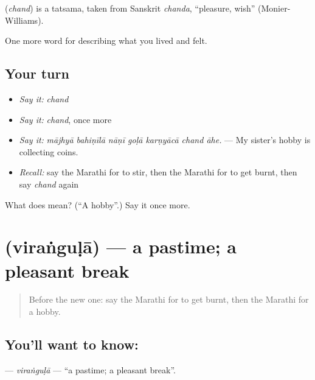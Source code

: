 \begin{cousinweb}
\textbf{} (\emph{chand}) is a tatsama, taken from Sanskrit \emph{chanda}, \textquotedblleft{}pleasure, wish\textquotedblright{} (Monier-Williams).
\end{cousinweb}

\begin{grammarlens}[title={What you've built}]
One more word for describing what you lived and felt.
\end{grammarlens}

\subsection*{Your turn}
\begin{itemize}
\raggedright
  \item \emph{Say it:} \emph{chand}
  \item \emph{Say it:} \emph{chand}, once more
  \item \emph{Say it:} \emph{mājhyā bahiṇīlā nāṇī goḷā karṇyācā chand āhe.} — My sister's hobby is collecting coins.
  \item \emph{Recall:} say the Marathi for to stir, then the Marathi for to get burnt, then say \emph{chand} again
\end{itemize}

\begin{tcolorbox}[breakable,colback=teal!4,colframe=teal!35!black,title={Before you move on}]
What does  mean? (\textquotedblleft{}A hobby\textquotedblright{}.) Say it once more.
\end{tcolorbox}
\section[\texorpdfstring{\mr{विरंगुळा} (viraṅguḷā)}{विरंगुळा (viraṅguḷā)}]{ (viraṅguḷā) — a pastime; a pleasant break}

\label{lesson:MR-C528-virangula}



\begin{quote}
Before the new one: say the Marathi for to get burnt, then the Marathi for a hobby.
\end{quote}

\subsection*{You'll want to know: }
\textbf{} — \emph{viraṅguḷā} — \textquotedblleft{}a pastime; a pleasant break\textquotedblright{}.

